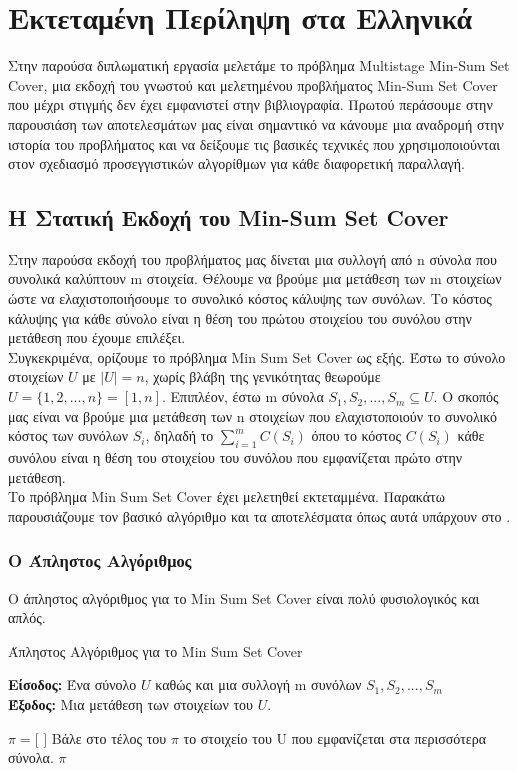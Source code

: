 \chapter{Εκτεταμένη Περίληψη στα Ελληνικά}

Στην παρούσα διπλωματική εργασία μελετάμε το πρόβλημα Multistage Min-Sum Set Cover, μια εκδοχή του γνωστού και μελετημένου προβλήματος Min-Sum Set Cover που μέχρι στιγμής δεν έχει εμφανιστεί στην βιβλιογραφία. Πρωτού περάσουμε στην παρουσιάση των αποτελεσμάτων μας είναι σημαντικό να κάνουμε μια αναδρομή στην ιστορία του προβλήματος και να δείξουμε τις βασικές τεχνικές που χρησιμοποιούνται στον σχεδιασμό προσεγγιστικών αλγορίθμων για κάθε διαφορετική παραλλαγή.

\section{Η Στατική Εκδοχή του Min-Sum Set Cover}

Στην παρούσα εκδοχή του προβλήματος μας δίνεται μια συλλογή από n σύνολα που συνολικά καλύπτουν m στοιχεία. Θέλουμε να βρούμε μια μετάθεση των m στοιχείων ώστε να ελαχιστοποιήσουμε το συνολικό κόστος κάλυψης των συνόλων. Το κόστος κάλυψης για κάθε σύνολο είναι η θέση του πρώτου στοιχείου του συνόλου στην μετάθεση που έχουμε επιλέξει. \\

Συγκεκριμένα, ορίζουμε το πρόβλημα Min Sum Set Cover ως εξής. Έστω το σύνολο στοιχείων $U$ με $|U|=n$, χωρίς βλάβη της γενικότητας θεωρούμε $U = \{1,2, ..., n \} = [ 1, n ]$. Επιπλέον, έστω m σύνολα $S_1, S_2, ..., S_m \subseteq U$. Ο σκοπός μας είναι να βρούμε μια μετάθεση των n στοιχείων που ελαχιστοποιούν το συνολικό κόστος των συνόλων $S_i$, δηλαδή το $\sum_{i=1}^m C( S_i )$ όπου το κόστος $C( S_i )$ κάθε συνόλου είναι η θέση του στοιχείου του συνόλου που εμφανίζεται πρώτο στην μετάθεση. \\

Το πρόβλημα Min Sum Set Cover έχει μελετηθεί εκτεταμμένα. Παρακάτω παρουσιάζουμε τον βασικό αλγόριθμο και τα αποτελέσματα όπως αυτά υπάρχουν στο \cite{FLT04}.

\subsection{Ο Άπληστος Αλγόριθμος}

Ο άπληστος αλγόριθμος για το Min Sum Set Cover είναι πολύ φυσιολογικός και απλός.

\begin{algorithm}[ht]
  \caption{Άπληστος Αλγόριθμος για το Min Sum Set Cover}\label{alg:mssc}
  \textbf{Είσοδος:} Ένα σύνολο $U$ καθώς και μια συλλογή m συνόλων $S_1, S_2, ..., S_m$\\
  \textbf{Έξοδος:} Μια μετάθεση των στοιχείων του $U$.

 \begin{algorithmic}[1]
    \STATE $\pi = \text{[ ]}$
        \STATE Βάλε στο τέλος του $\pi$ το στοιχείο του U που εμφανίζεται στα περισσότερα σύνολα.
    \ENDWHILE
    \RETURN $\pi$
  \end{algorithmic}
\end{algorithm}

